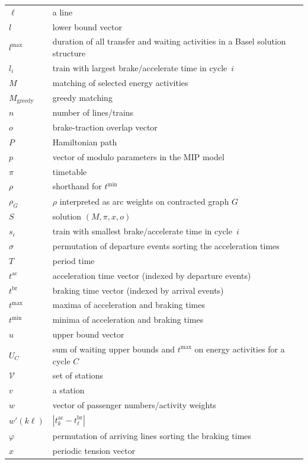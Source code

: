 \documentclass[11pt,a4paper]{article}
\newcommand{\ac}{\mathrm{ac}}
\newcommand{\br}{\mathrm{br}}
\newcommand{\w}{\rho} %
\theoremstyle{definition}
\theoremstyle{remark}
\begin{document}
\begin{longtable}{p{.11\linewidth}p{.83\linewidth}}
        $\ell$ & a line \\
        $l$ & lower bound vector \\
        $l^{\max}$ & duration of all transfer and waiting activities in a Basel solution structure \\
        $l_i$ & train with largest brake/accelerate time in cycle~$i$ \\
        $M$ & matching of selected energy activities \\
        $M_{\text{greedy}}$ & greedy matching \\
        $n$ & number of lines/trains \\
        $o$ & brake-traction overlap vector \\
        $P$ & Hamiltonian path \\
        $p$ & vector of modulo parameters in the MIP model \\
        $\pi$ & timetable \\
        $\w$ & shorthand for $t^{\min}$ \\
        $\w_G$ & $\w$ interpreted as arc weights on contracted graph $G$ \\
        $S$ & solution $(M, \pi, x, o)$ \\
        $s_i$ & train with smallest brake/accelerate time in cycle~$i$ \\
        $\sigma$ & permutation of departure events sorting the acceleration times \\
        $T$ & period time \\
        $t^{\ac}$ & acceleration time vector (indexed by departure events) \\
        $t^{\br}$ & braking time vector (indexed by arrival events) \\
        $t^{\max}$ & maxima of acceleration and braking times \\
        $t^{\min}$ & minima of acceleration and braking times \\
        $u$ & upper bound vector \\
        $U_C$ & sum of waiting upper bounds and $t^{\max}$ on energy activities for a cycle $C$ \\
        $\mathcal V$ & set of stations \\
        $v$ & a station \\
        $w$ & vector of passenger numbers/activity weights \\
        $w'(k\ell)$ & $|t_k^{\ac} - t_\ell^{\br}|$ \\
        $\varphi$ & permutation of arriving lines sorting the braking times \\
        $x$ & periodic tension vector \\
        \bottomrule
    \end{longtable}
\end{document}
